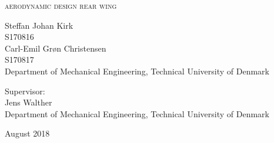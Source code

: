 
\begin{titlingpage}

\begin{center}

\vspace*{0cm}
\HUGE
\textsc{aerodynamic design rear wing}\\
\vspace{1.5cm}

%
\vspace{1.2cm}

\large
{
  Steffan Johan Kirk\\
    S170816\\
    Carl-Emil Grøn Christensen\\
    S170817\\
    Department of Mechanical Engineering, Technical University of Denmark
}
\vspace{1.5cm}

{
  Supervisor:\\
  Jens Walther\\
  Department of Mechanical Engineering, Technical University of Denmark
}

\vspace{1.5cm}
{August 2018}\\


\end{center}



\end{titlingpage}
